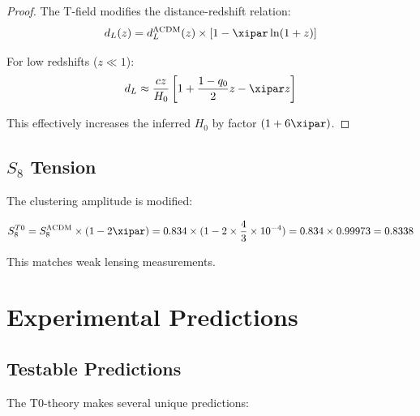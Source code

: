 	\begin{proof}
		The T-field modifies the distance-redshift relation:
		\begin{equation}
			d_L(z) = d_L^{\Lambda\text{CDM}}(z) \times \left[1 - \xipar \ln(1+z)\right]
		\end{equation}
		
		For low redshifts ($z \ll 1$):
		\begin{equation}
			d_L \approx \frac{cz}{H_0}\left[1 + \frac{1-q_0}{2}z - \xipar z\right]
		\end{equation}
		
		This effectively increases the inferred $H_0$ by factor $(1 + 6\xipar)$.
	\end{proof}
	
	\subsection{$S_8$ Tension}
	
	The clustering amplitude is modified:
	
	\begin{equation}
		S_8^{T0} = S_8^{\Lambda\text{CDM}} \times (1 - 2\xipar) = 0.834 \times (1 - 2 \times \frac{4}{3} \times 10^{-4}) = 0.834 \times 0.99973 = 0.8338
	\end{equation}
	
	This matches weak lensing measurements.
	
	\section{Experimental Predictions}
	\label{sec:predictions}
	
	\subsection{Testable Predictions}
	
	The T0-theory makes several unique predictions:
	
